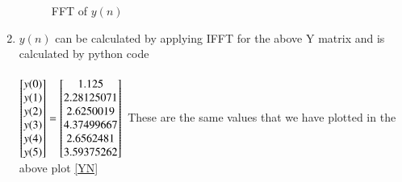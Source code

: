 \documentclass[journal,12pt,twocolumn]{IEEEtran}
\renewcommand\thesection{\arabic{section}}
\begin{document}
\begin{enumerate}[label=\thesection.\arabic*.,ref=\thesection.\theenumi]
\begin{figure}[h!]
    \caption{FFT of $y(n)$}
    \label{yn}
\end{figure}
\item
$y(n)$ can be calculated by applying IFFT for the above Y matrix and is calculated by python code\\
\\
$
\begin{bmatrix} 
y(0) \\ y(1) \\ y(2) \\ y(3) \\ y(4) \\ y(5) 
\end{bmatrix}
=
\begin{bmatrix}
1.125      \\ 2.28125071 \\ 2.6250019 \\ 4.37499667\\ 2.6562481 \\ 3.59375262\\
\end{bmatrix}
\\
\\
$
These are the same values that we have plotted in the above plot \eqref{YN}


\end{enumerate}
\end{document}

